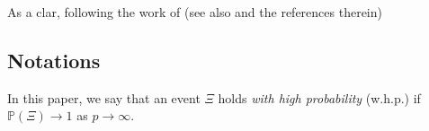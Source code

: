 

\begin{remark}
    As a clar,  following the work of \citet{hastie2019surprises} (see also \citet{bartlett2020benign} and the references therein)
\end{remark}

\subsection{Notations}





In this paper, we say that an event $\Xi$ holds \emph{with high probability} (w.h.p.) if $\mathbb P(\Xi)\to 1$ as $p\to \infty$.